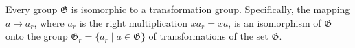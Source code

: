 Every group $\mathfrak{G}$ is isomorphic to a transformation group. Specifically, the mapping $a \mapsto a_r$, where $a_r$ is the right multiplication $x a_r = xa$, is an isomorphism of $\mathfrak{G}$ onto the group $\mathfrak{G}_r = \{a_r \mid a \in \mathfrak{G}\}$ of transformations of the set $\mathfrak{G}$.

